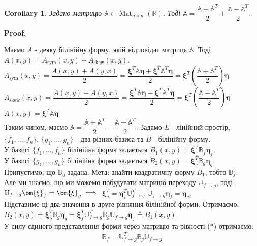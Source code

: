 \documentclass[a4paper, 10pt]{article}
\makeatletter
\theoremstyle{theoremdd}
\newtheorem{corollary}[theorem]{Corollary}
\DeclareMathOperator{\Mat}{Mat}
\renewenvironment{proof}[1][Proof.\\]{\par
\pushQED{\hfill \qed}%
\normalfont \topsep6\p@\@plus6\p@\relax
\trivlist
\item\relax
{\bfseries
#1\@addpunct{.}}\hspace\labelsep\ignorespaces
}{%
\popQED\endtrivlist\@endpefalse
}
\makeatother
\begin{document}
\begin{corollary}
Задано матрицю $\mathbb{A} \in \Mat_{n \times n}(\mathbb{R})$. Тоді $\mathbb{A} = \dfrac{\mathbb{A} + \mathbb{A}^T}{2} + \dfrac{\mathbb{A} - \mathbb{A}^T}{2}$.
\end{corollary}

\begin{proof}
Маємо $A$ - деяку білінійну форму, якій відповідає матриця $\mathbb{A}$. Тоді $A(x,y) = A_{\text{sym}}(x,y) + A_{\text{skew}}(x,y)$.\\
$A_{\text{sym}}(x,y) = \dfrac{A(x,y) + A(y,x)}{2} = \dfrac{\bm{\xi}^T \mathbb{A} \bm{\eta} + \bm{\xi}^T \mathbb{A}^T \bm{\eta}}{2} = \bm{\xi}^T \left( \dfrac{\mathbb{A} + \mathbb{A}^T}{2} \right) \bm{\eta}$\\
$A_{\text{skew}}(x,y) = \dfrac{A(x,y) - A(y,x)}{2} = \dfrac{\bm{\xi}^T \mathbb{A} \bm{\eta} - \bm{\xi}^T \mathbb{A}^T \bm{\eta}}{2} = \bm{\xi}^T \left( \dfrac{\mathbb{A} - \mathbb{A}^T}{2} \right) \bm{\eta}$\\
$A(x,y) = \bm{\xi}^T \mathbb{A} \bm{\eta}$\\
Таким чином, маємо $\mathbb{A} = \dfrac{\mathbb{A} + \mathbb{A}^T}{2} + \dfrac{\mathbb{A} - \mathbb{A}^T}{2}$.
\end{proof}
\noindent
Задамо $L$ - лінійний простір, $\{f_1,\dots,f_n\}$, $\{g_1,\dots,g_n\}$ - два різних базиса та $B$ - білінійну форму.\\
У базисі $\{f_1,\dots,f_n\}$ білінійна форма задається $B_1(x,y) = \bm{\xi}^T_f \mathbb{B}_f \bm{\eta}_f$.\\
У базисі $\{g_1,\dots,g_n\}$ білінійна форма задається $B_2(x,y) = \bm{\xi}^T_g \mathbb{B}_g \bm{\eta}_g$.\\
Припустимо, що $\mathbb{B}_g$ задана. Мета: знайти квадратичну форму $B_1$, тобто $\mathbb{B}_f$.\\
Але ми знаємо, що ми можемо побудувати матрицю переходу $\mathbb{U}_{f \to g}$, тоді $\mathbb{U}_{f \to g} \bm{\xi}_f = \bm{\xi}_g \implies \\ $ 
$\bm{\xi}_g^T = \bm{\eta}_f^T \mathbb{U}_{f \to g}^T$ \qquad $\mathbb{U}_{f \to g} \bm{\eta}_f = \bm{\eta}_g$.\\
Підставимо ці два значення в друге рівняння білінійної форми. Отримаємо:\\
$B_2(x,y) = \bm{\xi}_g^T \mathbb{B}_g \bm{\eta}_g = \bm{\xi}_f^T \mathbb{U}^T_{f \to g} \mathbb{B}_g \mathbb{U}_{f \to g} \bm{\eta}_f \overset{*}{=} B_1(x,y)$.\\
У силу єдиного представлення форми через матрицю та рівності (*) отримаємо:
\begin{align*}
\mathbb{B}_f = \mathbb{U}^T_{f \to g} \mathbb{B}_g \mathbb{U}_{f \to g}
\end{align*}
\end{document}
